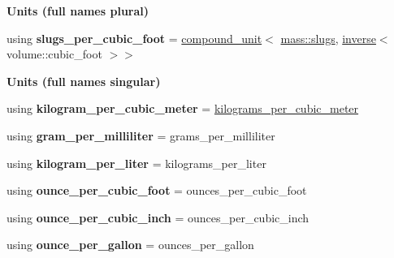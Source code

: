 \begin{Indent}{\bf Units (full names plural)}
\begin{DoxyCompactItemize}
\item 
\hypertarget{namespaceunits_1_1density_ac474d83a2c3b8844a922ede965a9dec7}{}using {\bfseries slugs\+\_\+per\+\_\+cubic\+\_\+foot} = \hyperlink{group___unit_types_ga9c3f6f077dc894620e1ed8358442a8f1}{compound\+\_\+unit}$<$ \hyperlink{structunits_1_1unit}{mass\+::slugs}, \hyperlink{group___unit_manipulators_gaacc539ef162e24b260d023d3ff949b57}{inverse}$<$ volume\+::cubic\+\_\+foot $>$$>$\label{namespaceunits_1_1density_ac474d83a2c3b8844a922ede965a9dec7}

\end{DoxyCompactItemize}
\end{Indent}
\begin{Indent}{\bf Units (full names singular)}\par
\begin{DoxyCompactItemize}
\item 
\hypertarget{namespaceunits_1_1density_aab04d099184d2ebd5b2b33fb4f97f6a4}{}using {\bfseries kilogram\+\_\+per\+\_\+cubic\+\_\+meter} = \hyperlink{structunits_1_1unit}{kilograms\+\_\+per\+\_\+cubic\+\_\+meter}\label{namespaceunits_1_1density_aab04d099184d2ebd5b2b33fb4f97f6a4}

\item 
\hypertarget{namespaceunits_1_1density_a20da72639be6ece6b33aef913054f50e}{}using {\bfseries gram\+\_\+per\+\_\+milliliter} = grams\+\_\+per\+\_\+milliliter\label{namespaceunits_1_1density_a20da72639be6ece6b33aef913054f50e}

\item 
\hypertarget{namespaceunits_1_1density_ad094042bf6aa764e4c56b32a8a44ab0c}{}using {\bfseries kilogram\+\_\+per\+\_\+liter} = kilograms\+\_\+per\+\_\+liter\label{namespaceunits_1_1density_ad094042bf6aa764e4c56b32a8a44ab0c}

\item 
\hypertarget{namespaceunits_1_1density_a06168fe7c0ef91843042f19b26c3d602}{}using {\bfseries ounce\+\_\+per\+\_\+cubic\+\_\+foot} = ounces\+\_\+per\+\_\+cubic\+\_\+foot\label{namespaceunits_1_1density_a06168fe7c0ef91843042f19b26c3d602}

\item 
\hypertarget{namespaceunits_1_1density_a25c1122f53cc19ab21bb730a64115e71}{}using {\bfseries ounce\+\_\+per\+\_\+cubic\+\_\+inch} = ounces\+\_\+per\+\_\+cubic\+\_\+inch\label{namespaceunits_1_1density_a25c1122f53cc19ab21bb730a64115e71}

\item 
\hypertarget{namespaceunits_1_1density_a43857556d35e1c6d7438d1611133c7fd}{}using {\bfseries ounce\+\_\+per\+\_\+gallon} = ounces\+\_\+per\+\_\+gallon\label{namespaceunits_1_1density_a43857556d35e1c6d7438d1611133c7fd}


\end{DoxyCompactItemize}
\end{Indent}
